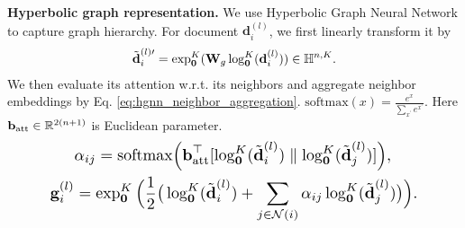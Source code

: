 \textbf{Hyperbolic graph representation.} We use Hyperbolic Graph Neural Network \cite{hgcn} to capture graph hierarchy. %
For document $ \textbf{d}_i^{(l)} $, we first linearly transform it by %
\begin{equation}
\label{eq:hgnn_linear_transformation}
\begin{split}
    \tilde{\textbf{d}}_i^{(l)\prime}=\exp_{\textbf{0}}^K(\textbf{W}_g\log_{\textbf{0}}^K(\textbf{d}_i^{(l)}))\in\Bbb H^{n,K}.%
\end{split}
\end{equation}
We then evaluate its attention w.r.t. its neighbors and aggregate neighbor embeddings by Eq. \ref{eq:hgnn_neighbor_aggregation}. %
$ \text{softmax}(x)=\frac{e^x}{\sum_{x^\prime}e^{x^\prime}} $. Here $ \textbf{b}_{\text{att}}\in\Bbb R^{2(n+1)} $ is Euclidean parameter.
\begin{equation}
\label{eq:hgnn_neighbor_aggregation}
\resizebox{0.87\columnwidth}{!}{
$ \begin{split}
    &\alpha_{ij}=\text{softmax}\Big(\textbf{b}_{\text{att}}^\top[\log_{\textbf{0}}^K(\tilde{\textbf{d}}_i^{(l)}) \parallel \log_{\textbf{0}}^K(\tilde{\textbf{d}}_j^{(l)})]\Big),\\
    \textbf{g}_i^{(l)}&=\exp_{\textbf{0}}^K\Big(\dfrac{1}{2}\big(\log_{\textbf{0}}^K(\tilde{\textbf{d}}_i^{(l)})+\sum_{j \in \mathcal{N}(i)}\alpha_{ij}\log_{\textbf{0}}^K(\tilde{\textbf{d}}_j^{(l)})\big)\Big).%
\end{split} $
}
\end{equation}
